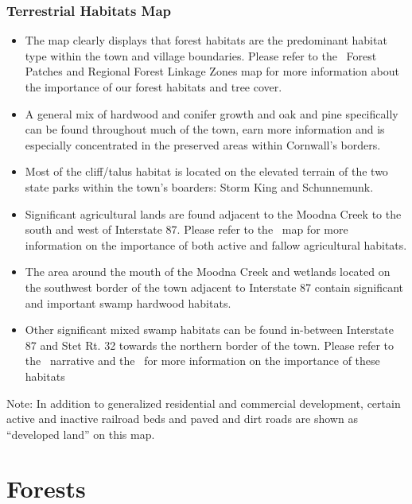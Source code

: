 \label{map:terrestrialhabitats}
\subsection*{Terrestrial Habitats Map}\label{subsec:terrestrialhabitatsmap}
\begin{itemize}
    \item The map clearly displays that forest habitats are the predominant
        habitat type within the town and village boundaries. Please refer to
        the~ Forest Patches and Regional Forest
        Linkage Zones map for more information about the importance of our
        forest habitats and tree cover.
    \item A general mix of hardwood and conifer growth and oak and pine specifically can be found
        throughout much of the town, earn more information and is especially
        concentrated in the preserved areas within Cornwall’s borders.
    \item Most of the cliff/talus habitat is located on the elevated terrain of 
         the two state parks within the town’s boarders: Storm King and Schunnemunk.
    \item Significant agricultural lands are found adjacent to the Moodna Creek to 
        the south and west of Interstate 87. Please refer to the~ map for more information on the importance
        of both active and fallow agricultural habitats.
    \item The area around the mouth of the Moodna Creek and wetlands located on
        the southwest border of the town adjacent to Interstate 87 contain
        significant and important swamp hardwood habitats.
    \item Other significant
       mixed swamp habitats can be found in-between Interstate 87 and Stet Rt. 32
        towards the northern border of the town. Please refer to the~
        narrative and the~ for more
        information on the importance of these habitats
\end{itemize}
Note: In addition to generalized residential and commercial development, 
certain active and inactive railroad beds and paved and dirt roads are shown
as ``developed land'' on this map.

\chapter{Forests}\label{subsec:forests}

